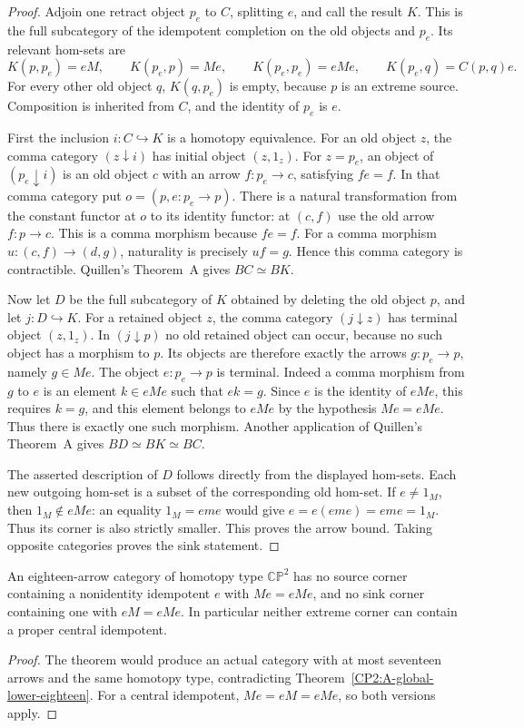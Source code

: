 \begin{proof}
Adjoin one retract object $p_e$ to $C$, splitting $e$, and call the
result $K$.  This is the full subcategory of the idempotent completion
on the old objects and $p_e$.  Its relevant hom-sets are
\[
 K(p,p_e)=eM,\qquad K(p_e,p)=Me,\qquad
 K(p_e,p_e)=eMe,\qquad K(p_e,q)=C(p,q)e.
\]
For every other old object $q$, $K(q,p_e)$ is empty, because $p$ is
an extreme source.  Composition is inherited from $C$, and the
identity of $p_e$ is $e$.

First the inclusion $i:C\hookrightarrow K$ is a homotopy equivalence.
For an old object $z$, the comma category $(z\downarrow i)$ has
initial object $(z,1_z)$.  For $z=p_e$, an object of
$(p_e\downarrow i)$ is an old object $c$ with an arrow
$f:p_e\to c$, satisfying $fe=f$.  In that comma category put
$o=(p,e:p_e\to p)$.  There is a natural transformation from the
constant functor at $o$ to its identity functor: at $(c,f)$ use the
old arrow $f:p\to c$.  This is a comma morphism because $fe=f$.
For a comma morphism $u:(c,f)\to(d,g)$, naturality is precisely
$uf=g$.  Hence this comma category is contractible.  Quillen's
Theorem~A gives $BC\simeq BK$.

Now let $D$ be the full subcategory of $K$ obtained by deleting the
old object $p$, and let $j:D\hookrightarrow K$.  For a retained
object $z$, the comma category $(j\downarrow z)$ has terminal
object $(z,1_z)$.  In $(j\downarrow p)$ no old retained object
can occur, because no such object has a morphism to $p$.  Its objects
are therefore exactly the arrows $g:p_e\to p$, namely $g\in Me$.
The object $e:p_e\to p$ is terminal.  Indeed a comma morphism
from $g$ to $e$ is an element $k\in eMe$ such that $ek=g$.
Since $e$ is the identity of $eMe$, this requires $k=g$, and this
element belongs to $eMe$ by the hypothesis $Me=eMe$.  Thus there
is exactly one such morphism.  Another application of Quillen's
Theorem~A gives $BD\simeq BK\simeq BC$.

The asserted description of $D$ follows directly from the displayed
hom-sets.  Each new outgoing hom-set is a subset of the corresponding
old hom-set.  If $e\ne1_M$, then $1_M\notin eMe$: an equality
$1_M=eme$ would give $e=e(eme)=eme=1_M$.  Thus its corner is also
strictly smaller.  This proves the arrow bound.  Taking opposite
categories proves the sink statement.
\end{proof}

\begin{corollary}[Proved]
\label{CP2:A-extreme-idempotent-eighteen}
An eighteen-arrow category of homotopy type $\mathbb{CP}^2$ has no
source corner containing a nonidentity idempotent $e$ with $Me=eMe$,
and no sink corner containing one with $eM=eMe$.
In particular neither extreme corner can contain a proper central
idempotent.
\end{corollary}
\begin{proof}
The theorem would produce an actual category with at most seventeen
arrows and the same homotopy type, contradicting
Theorem~\ref{CP2:A-global-lower-eighteen}.  For a central idempotent,
$Me=eM=eMe$, so both versions apply.
\end{proof}

